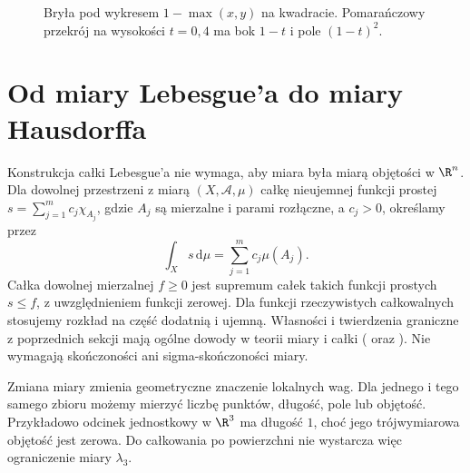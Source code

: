 \begin{figure}[htbp]
\centering
{}
\caption{Bryła pod wykresem $1-\max(x,y)$ na kwadracie.
Pomarańczowy przekrój na wysokości $t=0{,}4$ ma bok $1-t$
i pole $(1-t)^2$.}
\label{ma2:fig:lebesgue-cube-layer}
\end{figure}

\section{Od miary Lebesgue'a do miary Hausdorffa}

Konstrukcja całki Lebesgue'a nie wymaga,
aby miara była miarą objętości w $\R^n$.
Dla dowolnej przestrzeni z miarą
$(X,\mathcal A,\mu)$ całkę nieujemnej
funkcji prostej
$s=\sum_{j=1}^m c_j\chi_{A_j}$, gdzie
$A_j$ są mierzalne i parami rozłączne,
a $c_j>0$, określamy przez
\[
 \int_X s\,\mathrm d\mu=\sum_{j=1}^m c_j\mu(A_j).
\]
Całka dowolnej mierzalnej $f\ge0$ jest
supremum całek takich funkcji prostych
$s\le f$, z uwzględnieniem funkcji zerowej.
Dla funkcji rzeczywistych całkowalnych
stosujemy rozkład na część dodatnią i ujemną.
Własności i twierdzenia graniczne
z poprzednich sekcji mają ogólne dowody
w teorii miary i całki
(
oraz ).
Nie wymagają skończoności ani
sigma-skończoności miary.

Zmiana miary zmienia geometryczne znaczenie
lokalnych wag. Dla jednego i tego samego
zbioru możemy mierzyć liczbę punktów,
długość, pole lub objętość. Przykładowo
odcinek jednostkowy w $\R^3$ ma długość $1$,
choć jego trójwymiarowa objętość jest zerowa.
Do całkowania po powierzchni nie wystarcza
więc ograniczenie miary $\lambda_3$.

